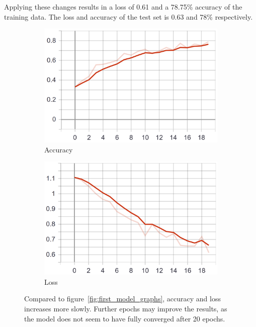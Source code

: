Applying these changes results in a loss of 0.61 and a 78.75\% accuracy of the training data.
The loss and accuracy of the test set is 0.63 and 78\% respectively.

\begin{figure}
    \centering
    \begin{subfigure}[b]{0.4\textwidth}
        \includegraphics[width=\textwidth]{images/first_model_data_augmentation_acc.png}
        \caption{Accuracy}
        \label{fig:first_model_data_augmentation_acc}
    \end{subfigure}
    \begin{subfigure}[b]{0.4\textwidth}
        \includegraphics[width=\textwidth]{images/first_model_data_augmentation_loss.png}
        \caption{Loss}
        \label{fig:first_model_data_augmentation_loss}
    \end{subfigure}
    \caption[Training after first augmentation]{Compared to figure~\ref{fig:first_model_graphs}, accuracy and loss increases more slowly. Further epochs may improve the results, as the model does not seem to have fully converged after 20 epochs.}
    \label{fig:first_model_data_augmentation_graphs}
\end{figure}

